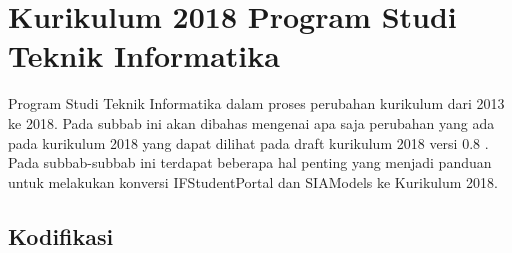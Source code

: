 \section{Kurikulum 2018 Program Studi Teknik Informatika}
\label{sec:kurikulum2018}

Program Studi Teknik Informatika dalam proses perubahan kurikulum dari 2013 ke 2018. Pada subbab ini akan dibahas mengenai apa saja perubahan yang ada pada kurikulum 2018 yang dapat dilihat pada draft kurikulum 2018 versi 0.8 \cite{draftkurikulum2018}. Pada subbab-subbab ini terdapat beberapa hal penting yang menjadi panduan untuk melakukan konversi IFStudentPortal dan SIAModels ke Kurikulum 2018.

\subsection{Kodifikasi}

